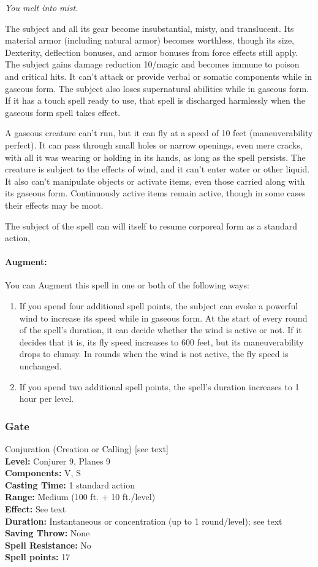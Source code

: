 \emph{You melt into mist.}

The subject and all its gear become insubstantial, misty, and translucent. 
Its material armor (including natural armor) becomes worthless, though its size, 
Dexterity, deflection bonuses, and armor bonuses from force effects still apply. 
The subject gains damage reduction 10/magic and becomes immune to poison and critical hits. 
It can't attack or provide verbal or somatic components while in gaseous form. 
The subject also loses supernatural abilities while in gaseous form. 
If it has a touch spell ready to use, that spell is discharged harmlessly when the gaseous form spell takes effect.

A gaseous creature can't run, but it can fly at a speed of 10 feet (maneuverability perfect). 
It can pass through small holes or narrow openings, even mere cracks, 
with all it was wearing or holding in its hands, as long as the spell persists. 
The creature is subject to the effects of wind, and it can't enter water or other liquid. 
It also can't manipulate objects or activate items, even those carried along with its gaseous form. 
Continuously active items remain active, though in some cases their effects may be moot.

The subject of the spell can will itself to resume corporeal form as a standard action,

\paragraph{Augment:} You can Augment this spell in one or both of the following ways:
\begin{enumerate}
 \item If you spend four additional spell points, the subject can evoke a powerful wind to increase its speed while in gaseous form.
 At the start of every round of the spell's duration, it can decide whether the wind is active or not. If it decides that it is,
 its fly speed increases to 600 feet, but its maneuverability drops to clumsy. In rounds when the wind is not active,
 the fly speed is unchanged.
 \item If you spend two additional spell points, the spell's duration increases to 1 hour per level.
\end{enumerate}
\subsubsection{Gate}
\label{Spell:Gate}
Conjuration (Creation or Calling) [see text]
\\ \textbf{Level:} Conjurer 9, Planes 9
\\ \textbf{Components:}  V, S
\\ \textbf{Casting Time:} 1 standard action
\\ \textbf{Range:} Medium (100 ft. + 10 ft./level)
\\ \textbf{Effect:} See text
\\ \textbf{Duration:} Instantaneous or concentration (up to 1 round/level); see text
\\ \textbf{Saving Throw:} None
\\ \textbf{Spell Resistance:}  No
\\ \textbf{Spell points:} 17

